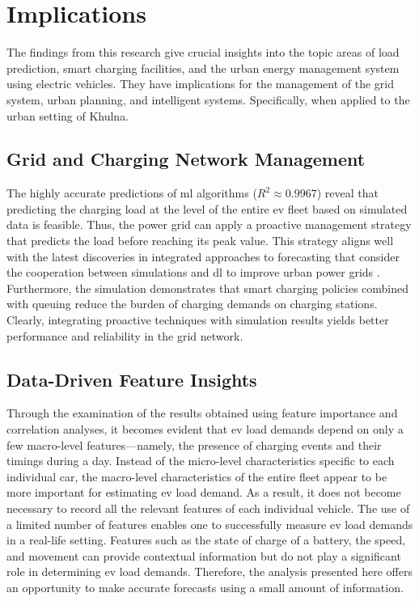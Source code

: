 \documentclass{thesis-library}
\begin{document}
{\section{Implications}

The findings from this research give crucial insights into the topic areas of load prediction, smart charging facilities, and the urban energy management system using electric vehicles. They have implications for the management of the grid system, urban planning, and intelligent systems. Specifically, when applied to the urban setting of Khulna.

\subsection{Grid and Charging Network Management}

The highly accurate predictions of \gls{ml} algorithms ($R^2 \approx 0.9967$) reveal that predicting the charging load at the level of the entire \Gls{ev} fleet based on simulated data is feasible. Thus, the power grid can apply a proactive management strategy that predicts the load before reaching its peak value. This strategy aligns well with the latest discoveries in integrated approaches to forecasting that consider the cooperation between simulations and \gls{dl} to improve urban power grids \cite{siddiqui2025electric}. Furthermore, the simulation demonstrates that smart charging policies combined with queuing reduce the burden of charging demands on charging stations. Clearly, integrating proactive techniques with simulation results yields better performance and reliability in the grid network.

\subsection{Data-Driven Feature Insights}

Through the examination of the results obtained using feature importance and correlation analyses, it becomes evident that \Gls{ev} load demands depend on only a few macro-level features—namely, the presence of charging events and their timings during a day. Instead of the micro-level characteristics specific to each individual car, the macro-level characteristics of the entire fleet appear to be more important for estimating \Gls{ev} load demand. As a result, it does not become necessary to record all the relevant features of each individual vehicle. The use of a limited number of features enables one to successfully measure \Gls{ev} load demands in a real-life setting. Features such as the state of charge of a battery, the speed, and movement can provide contextual information but do not play a significant role in determining \Gls{ev} load demands. Therefore, the analysis presented here offers an opportunity to make accurate forecasts using a small amount of information.

}
\end{document}
